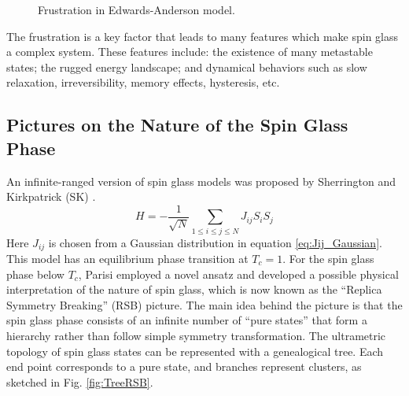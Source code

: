 \begin{figure}
  \centering
  \hspace{0.5cm}
  \caption{Frustration in Edwards-Anderson model.}
  \label{fig:frustration}
\end{figure}

The frustration is a key factor that leads to many features which make 
spin glass a complex system.
These features include: the existence of many metastable states; the rugged energy 
landscape; and dynamical behaviors such as slow relaxation, irreversibility, 
memory effects, hysteresis, etc. 


\subsection{Pictures on the Nature of the Spin Glass Phase}
\label{sec:meanfield-model}

An infinite-ranged version of spin glass models 
was proposed by Sherrington and Kirkpatrick (SK) \cite{Sherrington-Kirkpatrick-1975,Sherrington-Kirkpatrick1978}.
\begin{equation}
  \label{eq:SK}
  H=-\frac{1}{\sqrt{N}}\sum_{1\le i\le j\le N}J_{ij}S_iS_j
\end{equation}
Here $J_{ij}$ is chosen from a Gaussian distribution in equation 
\ref{eq:Jij_Gaussian}.
This model has an equilibrium phase transition at $T_c = 1$.
For the spin glass phase below $T_c$, Parisi\cite{Parisi1980,Parisi-1980b,Parisi-1980a} employed a novel ansatz and 
developed a  possible physical interpretation of the nature of spin glass, 
which is now known as the ``Replica Symmetry Breaking'' (RSB) picture. The main
idea behind the picture is that the spin glass phase consists of an infinite 
number of ``pure states'' that form a hierarchy rather than follow simple symmetry
transformation. 
The ultrametric topology of spin glass states can be represented with a 
genealogical tree. Each end point corresponds to a pure state, and branches 
represent clusters, as sketched in Fig. \ref{fig:TreeRSB}. 

